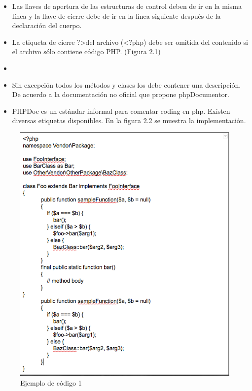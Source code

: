 \begin{itemize}
\begin{itemize}
\begin{itemize}
				\item Las llaves de apertura de las estructuras de control deben de ir en la misma línea y la llave de cierre debe de ir en la línea siguiente después de la declaración del cuerpo.

				\item La etiqueta de cierre ?\textgreater del archivo (\textless ?php) debe ser omitida del contenido si el archivo sólo contiene código PHP. (Figura 2.1)
				
				\item 								
				\item Sin excepción todos los métodos y clases los debe contener una descripción. De acuerdo a la documentación no oficial que propone phpDocumentor.

				
				\item PHPDoc es un estándar informal para comentar coding en php. Existen diversas etiquetas disponibles. En la figura 2.2 se muestra la implementación.

			\end{itemize}
	\end{itemize}
\end{itemize}

				\begin{figure}[htbp!]
		\centering
			\includegraphics[width=.8\textwidth]{images/ejemploCodigo1}
		\caption{Ejemplo de código 1}
	\end{figure}
				

